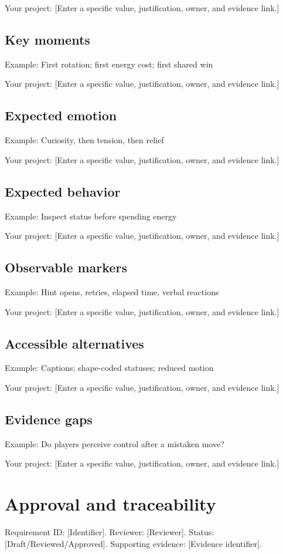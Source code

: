 \documentclass[11pt]{article}
\begin{document}
Your project: [Enter a specific value, justification, owner, and evidence link.]


\subsection{Key moments}
Example: First rotation; first energy cost; first shared win

Your project: [Enter a specific value, justification, owner, and evidence link.]


\subsection{Expected emotion}
Example: Curiosity, then tension, then relief

Your project: [Enter a specific value, justification, owner, and evidence link.]


\subsection{Expected behavior}
Example: Inspect status before spending energy

Your project: [Enter a specific value, justification, owner, and evidence link.]


\subsection{Observable markers}
Example: Hint opens, retries, elapsed time, verbal reactions

Your project: [Enter a specific value, justification, owner, and evidence link.]


\subsection{Accessible alternatives}
Example: Captions; shape-coded statuses; reduced motion

Your project: [Enter a specific value, justification, owner, and evidence link.]


\subsection{Evidence gaps}
Example: Do players perceive control after a mistaken move?

Your project: [Enter a specific value, justification, owner, and evidence link.]


\section{Approval and traceability}
Requirement ID: [Identifier]. Reviewer: [Reviewer]. Status: [Draft/Reviewed/Approved]. Supporting evidence: [Evidence identifier].
\end{document}
